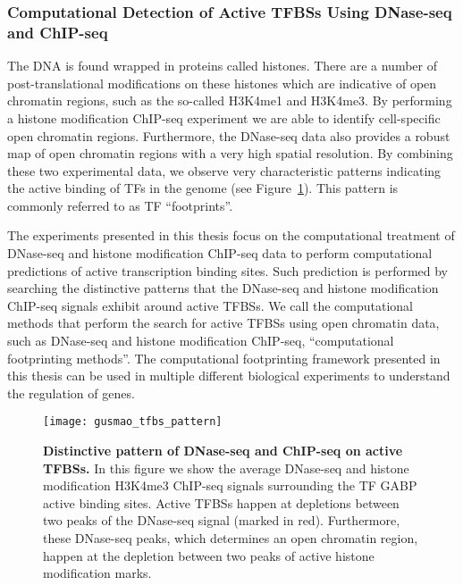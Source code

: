 \subsubsection{Computational Detection of Active TFBSs Using DNase-seq and ChIP-seq}

The DNA is found wrapped in proteins called histones. There are a number of post-translational modifications on these histones which are indicative of open chromatin regions, such as the so-called H3K4me1 and H3K4me3. By performing a histone modification ChIP-seq experiment we are able to identify cell-specific open chromatin regions. Furthermore, the DNase-seq data also provides a robust map of open chromatin regions with a very high spatial resolution. By combining these two experimental data, we observe very characteristic patterns indicating the active binding of TFs in the genome (see Figure~\ref{fig:gusmao_tfbs_pattern}). This pattern is commonly referred to as TF ``footprints''.

The experiments presented in this thesis focus on the computational treatment of DNase-seq and histone modification ChIP-seq data to perform computational predictions of active transcription binding sites. Such prediction is performed by searching the distinctive patterns that the DNase-seq and histone modification ChIP-seq signals exhibit around active TFBSs. We call the computational methods that perform the search for active TFBSs using open chromatin data, such as DNase-seq and histone modification ChIP-seq, ``computational footprinting methods''. The computational footprinting framework presented in this thesis can be used in multiple different biological experiments to understand the regulation of genes.

\begin{figure}[h!]
\centering
\texttt{[image: gusmao\_tfbs\_pattern]}
\caption[Distinctive pattern of DNase-seq and ChIP-seq on active TFBSs]{\textbf{Distinctive pattern of DNase-seq and ChIP-seq on active TFBSs.} In this figure we show the average DNase-seq and histone modification H3K4me3 ChIP-seq signals surrounding the TF GABP active binding sites. Active TFBSs happen at depletions between two peaks of the DNase-seq signal (marked in red). Furthermore, these DNase-seq peaks, which determines an open chromatin region, happen at the depletion between two peaks of active histone modification marks.}
\label{fig:gusmao_tfbs_pattern}
\end{figure}

